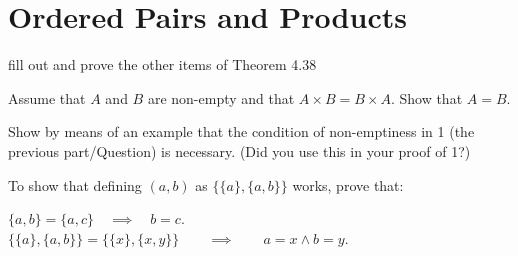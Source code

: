 \section{Ordered Pairs and Products}

\begin{Exercise} [number=39]
fill out and prove the other items of Theorem 4.38
\end{Exercise}

\begin{Exercise} [number=40]
  \Question Assume that $A$ and $B$ are non-empty and that $A \times B
  = B \times A$. Show that $A = B$.

  \Question Show by means of an example that the condition of
  non-emptiness in 1 (the previous part/Question) is necessary. (Did
  you use this in your proof of 1?)
\end{Exercise}

\begin{Exercise} [number=41, difficulty=1]
  To show that defining $(a,b)$ as $\bigl\{ \{a\}, \{a,b\} \bigr\}$
  works, prove that:

  \Question $\{a, b\} = \{a, c\} \quad \implies \quad b = c$.
  \Question $\bigl\{ \{a\}, \{a, b\}\bigr\} = \bigl\{ \{x\}, \{x, y\}
  \bigr\} \qquad \implies \qquad a = x \land b = y$.
\end{Exercise}